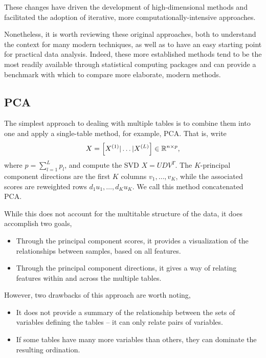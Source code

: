 \documentclass[utf8]{frontiersFPHY} %
\begin{document}
These changes have driven the development of high-dimensional methods and
facilitated the adoption of iterative, more computationally-intensive
approaches.

Nonetheless, it is worth reviewing these original approaches, both to understand
the context for many modern techniques, as well as to have an easy starting
point for practical data analysis. Indeed, these more established methods tend
to be the most readily available through statistical computing packages and can
provide a benchmark with which to compare more elaborate, modern methods.

\subsection{PCA}
\label{subsec:pca}

The simplest approach to dealing with multiple tables is to combine them into
one and apply a single-table method, for example, PCA. That is, write
\begin{align*}
X = \left[X^{(1)} \vert \dots \vert X^{(L)}\right] \in \mathbb{R}^{n \times p},
\end{align*}
where $p = \sum_{l = 1}^{L}p_{l}$, and compute the SVD $X = UDV^{T}$. The
$K$-principal component directions are the first $K$ columns $v_{1}, \dots,
v_{K}$, while the associated scores are reweighted rows $d_{1}u_{1}, \dots,
d_{K}u_{K}$. We call this method concatenated PCA.

While this does not account for the multitable structure of the data, it does
accomplish two goals,
\begin{itemize}
\item Through the principal component scores, it provides a visualization of the
  relationships between samples, based on all features.
\item Through the principal component directions, it gives a way of relating
  features within and across the multiple tables.
\end{itemize}

However, two drawbacks of this approach are worth noting,
\begin{itemize}
  \item It does not provide a summary of the relationship between the sets of
    variables defining the tables -- it can only relate pairs of variables.
  \item If some tables have many more variables than others, they can dominate
    the resulting ordination.
\end{itemize}
\end{document}

